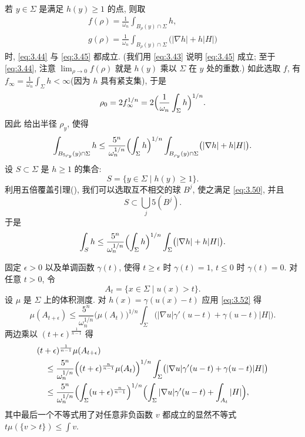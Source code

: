 若 $y\in\Sigma$ 是满足 $h(y)\geq1$ 的点, 则取
\begin{gather*}
f(\rho)=\frac{1}{\omega_n}\int_{B_\rho(y)\cap\Sigma}h,\\
g(\rho)=\frac{1}{\omega_n}\int_{B_\rho(y)\cap\Sigma}
 \bigl(|\nabla h|+h|H|\bigr)
\end{gather*}
时, \eqref{eq:3.44} 与 \eqref{eq:3.45} 都成立. (我们用 \eqref{eq:3.43} 说明 \eqref{eq:3.45} 成立; 至于
\eqref{eq:3.44}, 注意 $\lim_{\rho\to0}f(\rho)$ 就是 $h(y)$ 乘以 $\Sigma$ 在 $y$
处的重数.) 如此选取 $f$, 有
$f_\infty=\frac{1}{\omega_n}\int_\Sigma h<\infty$(因为 $h$ 具有紧支集),
于是
\[
\rho_0=2f_\infty^{1/n}
 =2\Bigl(\frac{1}{\omega_n}\int_\Sigma h\Bigr)^{1/n}.
\]
因此 给出半径 $\rho_y$, 使得
\begin{equation}
\int_{B_{5\rho_y}(y)\cap\Sigma}h
 \leq\frac{5^n}{\omega_n^{1/n}}
 \Bigl(\int_\Sigma h\Bigr)^{1/n}
 \int_{B_{\rho_y}(y)\cap\Sigma}\bigl(|\nabla h|+h|H|\bigr).
\label{eq:3.50}
\end{equation}
设 $S\subset\Sigma$ 是 $h\geq1$ 的集合:
\[
S=\{y\in\Sigma\mid h(y)\geq1\}.
\]
利用五倍覆盖引理(), 我们可以选取互不相交的球 $B^j$, 使之满足
\eqref{eq:3.50}, 并且
\begin{equation}
S\subset\bigcup_j5(B^j).
\label{eq:3.51}
\end{equation}
于是
\begin{equation}
\int_S h\leq\frac{5^n}{\omega_n^{1/n}}
 \Bigl(\int_\Sigma h\Bigr)^{1/n}
 \int_\Sigma\bigl(|\nabla h|+h|H|\bigr).
\label{eq:3.52}
\end{equation}

固定 $\epsilon>0$ 以及单调函数 $\gamma(t)$, 使得 $t\geq\epsilon$ 时
$\gamma(t)=1$, $t\leq0$ 时 $\gamma(t)=0$. 对任意 $t>0$, 令
\begin{equation}
A_t=\{x\in\Sigma\mid u(x)>t\}.
\label{eq:3.53}
\end{equation}
设 $\mu$ 是 $\Sigma$ 上的体积测度. 对 $h(x)=\gamma(u(x)-t)$ 应用 \eqref{eq:3.52} 得
\begin{equation}
\mu(A_{t+\epsilon})\leq\frac{5^n}{\omega_n^{1/n}}
 \bigl(\mu(A_t)\bigr)^{1/n}
 \int_\Sigma\bigl(|\nabla u|\gamma'(u-t)+\gamma(u-t)|H|\bigr).
\label{eq:3.54}
\end{equation}
两边乘以 $(t+\epsilon)^{\frac{1}{n-1}}$ 得
\begin{equation}
\begin{aligned}
&(t+\epsilon)^{\frac{1}{n-1}}\mu(A_{t+\epsilon})\\
&\quad\leq\frac{5^n}{\omega_n^{1/n}}
 \Bigl((t+\epsilon)^{\frac{n}{n-1}}\mu(A_t)\Bigr)^{1/n}
 \int_\Sigma\bigl(|\nabla u|\gamma'(u-t)+\gamma(u-t)|H|\bigr)\\
&\quad\leq\frac{5^n}{\omega_n^{1/n}}
 \Bigl(\int_\Sigma(u+\epsilon)^{\frac{n}{n-1}}\Bigr)^{1/n}
 \Bigl(\int_\Sigma|\nabla u|\gamma'(u-t)+\int_{A_t}|H|\Bigr),
\end{aligned}
\label{eq:3.55}
\end{equation}
其中最后一个不等式用了对任意非负函数 $v$ 都成立的显然不等式
$t\mu(\{v>t\})\leq\int v$.

